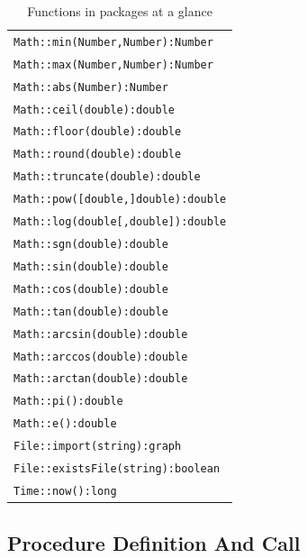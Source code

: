 \begin{table}[htbp]
\centering
\begin{tabular}{|l|}
\hline
\texttt{Math::min(Number,Number):Number}\\
\texttt{Math::max(Number,Number):Number}\\
\texttt{Math::abs(Number):Number}\\
\hline
\texttt{Math::ceil(double):double}\\
\texttt{Math::floor(double):double}\\
\texttt{Math::round(double):double}\\
\texttt{Math::truncate(double):double}\\
\hline
\texttt{Math::pow([double,]double):double}\\
\texttt{Math::log(double[,double]):double}\\
\texttt{Math::sgn(double):double}\\
\hline
\texttt{Math::sin(double):double}\\
\texttt{Math::cos(double):double}\\
\texttt{Math::tan(double):double}\\
\hline
\texttt{Math::arcsin(double):double}\\
\texttt{Math::arccos(double):double}\\
\texttt{Math::arctan(double):double}\\
\hline
\texttt{Math::pi():double}\\
\texttt{Math::e():double}\\
\hline
\texttt{File::import(string):graph}\\
\texttt{File::existsFile(string):boolean}\\
\hline
\texttt{Time::now():long}\\
\hline
\end{tabular}
\caption{Functions in packages at a glance}
\label{packagefuncstab}
\end{table}


\subsection{Procedure Definition And Call}\label{sub:procedures}\label{sec:proccall} 

